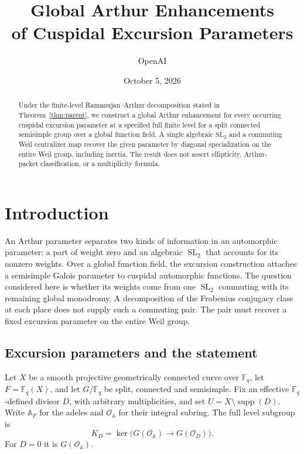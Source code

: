 \documentclass[11pt]{article}
\title{Global Arthur Enhancements\\of Cuspidal Excursion Parameters}
\author{OpenAI}
\date{October 5, 2026}
\numberwithin{equation}{section}
\theoremstyle{definition}
\theoremstyle{remark}
\newcommand{\F}{\mathbb F}
\newcommand{\SL}{\operatorname{SL}}
\newcommand{\supp}{\operatorname{supp}}
\begin{document}
\maketitle
\begin{abstract}
Under the finite-level Ramanujan--Arthur decomposition stated in
Theorem~\ref{thm:parent}, we construct a global Arthur enhancement for
every occurring cuspidal excursion parameter at a specified full finite
level for a split connected semisimple group over a global function field.
A single algebraic $\mathrm{SL}_2$ and a commuting Weil centralizer map
recover the given parameter by diagonal specialization on the entire Weil
group, including inertia. The result does not assert ellipticity,
Arthur-packet classification, or a multiplicity formula.
\end{abstract}
\tableofcontents

\section{Introduction}\label{sec:introduction}

An Arthur parameter separates two kinds of information in an automorphic
parameter: a part of weight zero and an algebraic $\SL_2$ that accounts for
its nonzero weights.  Over a global function field, the excursion construction
attaches a semisimple Galois parameter to cuspidal automorphic functions.
The question considered here is whether its weights come from one
$\SL_2$ commuting with its remaining global monodromy.  A decomposition
of the Frobenius conjugacy class at each place does not supply such a
commuting pair.  The pair must recover a fixed excursion parameter on
the entire Weil group.

\subsection{Excursion parameters and the statement}

Let $X$ be a smooth projective geometrically connected curve over
$\F_q$, let $F=\F_q(X)$, and let $G/\F_q$ be split, connected and
semisimple.  Fix an effective $\F_q$-defined divisor $D$, with arbitrary
multiplicities, and set $U=X\setminus\supp(D)$.  Write $\mathbb A_F$
for the adeles and $\mathcal O_{\mathbb A}$ for their integral subring.
The full level subgroup is
\[
 K_D=\ker\bigl(G(\mathcal O_{\mathbb A})\longrightarrow
                         G(\mathcal O_D)\bigr).
\]
For $D=0$ it is $G(\mathcal O_{\mathbb A})$.
\end{document}
